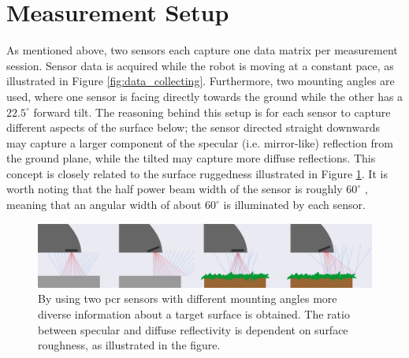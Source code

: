 \section{Measurement Setup}\label{sec:setup}
As mentioned above, two sensors each capture one data matrix per measurement session. Sensor data is acquired while the robot is moving at a constant pace, as illustrated in Figure \ref{fig:data_collecting}. Furthermore, two mounting angles are used, where one sensor is facing directly towards the ground while the other has a $22.5^\circ$ forward tilt. The reasoning behind this setup is for each sensor to capture different aspects of the surface below; the sensor directed straight downwards may capture a larger component of the specular (i.e. mirror-like) reflection from the ground plane, while the tilted may capture more diffuse reflections. This concept is closely related to the surface ruggedness illustrated in Figure \ref{fig:reflections}. It is worth noting that the half power beam width of the sensor is roughly $60^\circ$ \citep{acconeer_datasheet_a111}, meaning that an angular width of about $60^\circ$ is illuminated by each sensor.

\begin{figure}[h]
	\centering
	\includegraphics[scale=0.2]{figs_temp/reflections.jpg}
	\caption{By using two \gls{pcr} sensors with different mounting angles more diverse information about a target surface is obtained. The ratio between specular and diffuse reflectivity is dependent on surface roughness, as illustrated in the figure.}
	\label{fig:reflections}
\end{figure}

